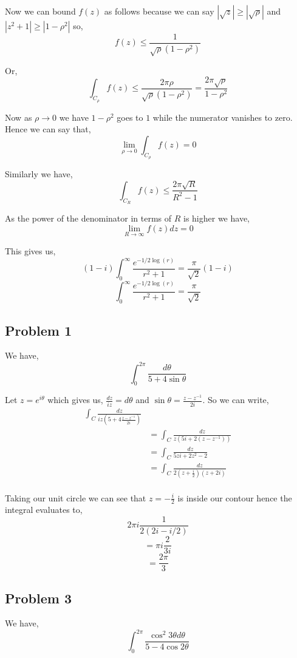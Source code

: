 \documentclass[a4paper]{report}
\begin{document}
Now we can bound $f(z)$ as follows because we can say $|\sqrt{z} | \ge | \sqrt{\rho}|$ and  $|z^2 + 1| \ge |1 - \rho^2|$ so, 
$$ f(z) \le \frac{1}{\sqrt{\rho} (1 - \rho^2)} $$ 

Or, 
$$ \int_{C_\rho} f(z)\le \frac{2\pi \rho}{\sqrt{\rho} (1 - \rho^2)} = \frac{2\pi \sqrt{\rho}}{1 - \rho^2} $$ 

Now as $\rho \rightarrow 0$ we have $1 - \rho^2$ goes to $1$ while the numerator vanishes to zero. Hence we can say that, 
$$ \lim_{\rho \to 0} \int_{C_\rho} f(z) = 0 $$ 

Similarly we have, 
$$ \int_{C_R} f(z) \le \frac{2 \pi \sqrt{R}}{R^2 - 1} $$ 

As the power of the denominator in terms of $R$ is higher we have, 
$$ \lim_{R \to \infty} f(z) dz = 0 $$ 

This gives us, 
$$ (1 - i)\int_{0}^{\infty} \frac{e^{-1 / 2\log(r)}}{r^2 + 1} = \frac{\pi}{\sqrt{2}}(1 - i) $$
$$ \int_{0}^{\infty} \frac{e^{-1 / 2\log(r)}}{r^2 + 1} = \frac{\pi}{\sqrt{2}} $$



\subsection{Problem 1}
We have, 
$$ \int_0^{2\pi} \frac{d\theta}{5 + 4 \sin \theta} $$ 

Let $z = e^{i\theta}$ which gives  us, $\frac{dz}{iz} = d\theta$ and $\sin \theta = \frac{z - z^{-1}}{2i}$. So we can write, 
\begin{align*}
\int_C \frac{dz}{iz (5 + 4\frac{z - z^{-1}}{2i})}\\
&= \int_C \frac{dz}{z (5i + 2 (z - z^{-1}))}\\
&= \int_C \frac{dz}{5zi + 2 z^2 - 2}\\
&= \int_C \frac{dz}{2(z + \frac{i}{2}) (z + 2i)}\\
\end{align*}

Taking our unit circle we can see that $z = -\frac{i}{2}$ is inside our contour hence the integral evaluates to, 
$$ 2\pi i \frac{1}{2 (2i - i / 2)} $$ 
$$ = \pi i \frac{2}{3i} $$ 
$$ = \frac{2\pi}{3}$$


\subsection*{Problem 3}
We have, 
$$ \int_0^{2\pi} \frac{\cos^2 3\theta d\theta}{5 - 4\cos 2\theta} $$ 
\end{document}

